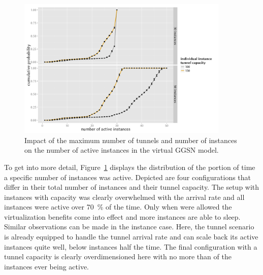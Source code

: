 \begin{figure}[htbp]
	\centering
	\includegraphics[width=0.9\textwidth]{images/R-virtualized-instanceuse.pdf}
	\caption{Impact of the maximum number of tunnels and number of instances on the number of active instances in the virtual \acrshort{GGSN} model.}
\label{c4:fig:virtualized_instanceuse}
\end{figure}

To get into more detail, Figure~\ref{c4:fig:virtualized_instanceuse} displays the distribution of the portion of time a specific number of instances was active. Depicted are four configurations that differ in their total number of instances and their tunnel capacity. The setup with  instances with  capacity was clearly overwhelmed with the arrival rate and all  instances were active over \SI{70}{\percent} of the time. Only when  were allowed the virtualization benefits come into effect and more instances are able to sleep. Similar observations can be made in the  instance case.  Here, the  tunnel scenario is already equipped to handle the tunnel arrival rate and can scale back its active instances quite well, below  instances half the time. The final configuration with a  tunnel capacity is clearly overdimensioned here with no more than  of the  instances ever being active.

